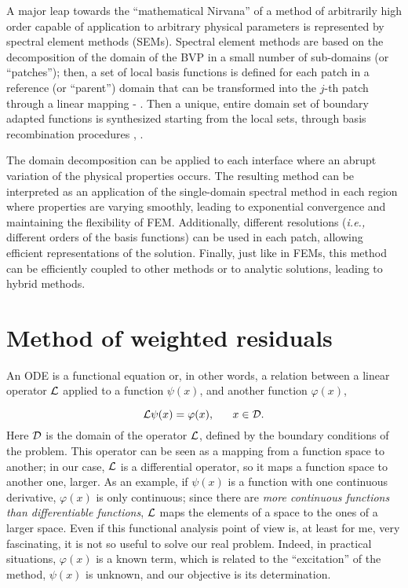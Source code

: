 \documentclass[a4paper,12pt]{article}
\begin{document}
A major leap towards the ``mathematical Nirvana'' of a method of arbitrarily high order capable of application to arbitrary physical parameters is represented by spectral element methods (SEMs). Spectral element methods are based on the decomposition of the domain of the BVP in a small number of sub-domains (or ``patches''); then, a set of local basis functions is defined for each patch in a reference (or ``parent'') domain that can be transformed into the $j$-th patch through a linear mapping \cite{canuto1} - \cite{canuto2}. Then a unique, entire domain set of boundary adapted functions is synthesized starting from the local sets, through basis recombination procedures \cite{tibaldiphd}, \cite{peverini}.

The domain decomposition can be applied to each interface where an abrupt variation of the physical properties occurs. The resulting method can be interpreted as an application of the single-domain spectral method in each region where properties are varying smoothly, leading to exponential convergence and maintaining the flexibility of FEM. Additionally, different resolutions (\textit{i.e.,} different orders of the basis functions) can be used in each patch, allowing efficient representations of the solution. Finally, just like in FEMs, this method can be efficiently coupled to other methods or to analytic solutions, leading to hybrid methods.

\section{Method of weighted residuals}

An ODE is a functional equation or, in other words, a relation between a linear operator $\mathcal{L}$ applied to a function $\psi(x)$, and another function $\varphi(x)$,

\begin{equation}
\mathcal{L} \psi(x) = \varphi(x), ~~~~~ x \in \mathcal{D}.
\label{eq:functionalequation}
\end{equation}
Here $\mathcal{D}$ is the domain of the operator $\mathcal{L}$, defined by the boundary conditions of the problem. This operator can be seen as a mapping from a function space to another; in our case, $\mathcal{L}$ is a differential operator, so it maps a function space to another one, larger. As an example, if $\psi(x)$ is a function with one continuous derivative, $\varphi(x)$ is only continuous; since there are \textit{more continuous functions than differentiable functions}, $\mathcal{L}$ maps the elements of a space to the ones of a larger space. Even if this functional analysis point of view is, at least for me, very fascinating, it is not so useful to solve our real problem. Indeed, in practical situations, $\varphi(x)$ is a known term, which is related to the ``excitation'' of the method, $\psi(x)$ is unknown, and our objective is its determination. 
\end{document}
